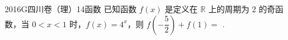 
\begin{problem}{2016}{G}{四川卷（理）}{14}{函数}
已知函数 $ f(x) $ 是定义在 $ \mathbb{R} $ 上的周期为 $ 2 $ 的奇函数，当 $ 0<x<1 $ 时，$ f(x)=4^x $，则 $ f\left(-\dfrac{5}{2}\right)+f(1)= $ \underline{\hspace{4em}}.
\end{problem}

\begin{answer}

\end{answer}

\begin{solutions}

\end{solutions}